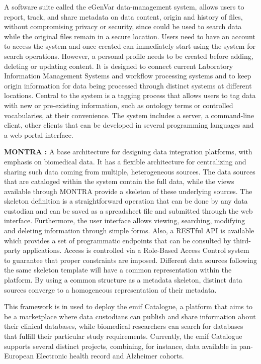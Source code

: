 A software suite called the eGenVar data-management system, allows users to report,
track, and share metadata on data content, origin and history of files, without
compromising privacy or security, since could be used to search data while the original
files remain in a secure location.
Users need to have an account to access the system and once created can immediately
start using the system for search operations.
However, a personal profile needs to be created before adding, deleting or updating
content.
It is designed to connect current Laboratory Information Management Systems and
workflow processing systems and to keep origin information for data being processed
through distinct systems at different locations.
Central to the system is a tagging process that allows users to tag data with new or
pre-existing information, such as ontology terms or controlled vocabularies, at their
convenience.
The system includes a server, a command-line client, other clients that can be
developed in several programming languages and a web portal interface.


\textbf{MONTRA \cite{montra}:}
A base architecture for designing data integration platforms, with emphasis on
biomedical data.
It has a flexible architecture for centralizing and sharing such data coming from
multiple, heterogeneous sources.
The data sources that are cataloged within the system contain the full data, while the
views available through MONTRA provide a skeleton of these underlying sources.
The skeleton definition is a straightforward operation that can be done by any data
custodian and can be saved as a spreadsheet file and submitted through the web
interface.
Furthermore, the user interface allows viewing, searching, modifying and deleting
information through simple forms.
Also, a RESTful API is available which provides a set of programmatic endpoints that
can be consulted by third-party applications.
Access is controlled via a Role-Based Access Control system to guarantee that proper
constraints are imposed.
Different data sources following the same skeleton template will have a common
representation within the platform.
By using a common structure as a metadata skeleton, distinct data sources converge to a
homogeneous representation of their metadata.

This framework is in used to deploy the \gls{emif} Catalogue, a platform that aims to
be a marketplace where data custodians can publish and share information about their
clinical databases, while biomedical researchers can search for databases that fulfill
their particular study requirements.
Currently, the \gls{emif} Catalogue supports several distinct projects, combining, for
instance, data available in pan-European Electronic health record and Alzheimer
cohorts.

